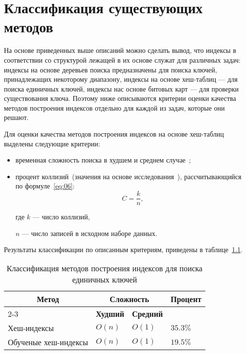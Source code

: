 \chapter{Классификация существующих методов\label{classification}}

На основе приведенных выше описаний можно сделать вывод, что индексы в
соответствии со структурой лежащей в их основе служат для различных задач:
индексы на основе деревьев поиска предназначены для поиска ключей, принадлежащих
некоторому диапазону, индексы на основе хеш-таблиц --- для поиска единичных
ключей, индексы нас основе битовых карт --- для проверки существования ключа.
Поэтому ниже описываются критерии оценки качества методов построения
индексов отдельно для каждой из задач, которые они решают.

Для оценки качества методов построения индексов на основе хеш-таблиц выделены
следующие критерии:
\begin{itemize}
    \item временная сложность поиска в худшем и среднем случае~\cite{main,
        squares};
    \item процент коллизий~(значения на основе исследования~\cite{main}),
        рассчитывающийся по формуле~\eqref{eq:06}:
        \begin{equation}\label{eq:06}
            C = \frac{k}{n},
        \end{equation}
        
      где $k$ --- число коллизий,
      
      $n$ --- число записей в исходном наборе данных.
\end{itemize}

Результаты классификации по описанным критериям, приведены в таблице~\ref{tab:02}.

{
\captionsetup{format=hang,justification=raggedleft,
              singlelinecheck=off,width=13.3cm}
\begin{longtable}[Hc]{|p{5.3cm}|p{2cm}|p{2cm}|p{2cm}|}
\caption{Классификация методов построения индексов для поиска единичных
ключей\label{tab:02}}\\
    \hline
    \multicolumn{1}{|c|}{\multirow{2}{*}{\textbf{Метод}}} &
    \multicolumn{2}{c|}{\textbf{Сложность}} &
    \multicolumn{1}{c|}{\multirow{2}{*}{\parbox{2cm}{\textbf{Процент}}}}\\
    \cline{2-3}
    & \multicolumn{1}{c|}{\textbf{Худший}}
    & \multicolumn{1}{c|}{\textbf{Средний}}
    &\\
    \hline
    Хеш-индексы
    & $O(n)$
    & $O(1)$
    & $35.3\%$\\
    \hline
    Обученые хеш-индексы
    & $O(n)$
    & $O(1)$
    & $19.5\%$\\
    \hline
\end{longtable}
}


